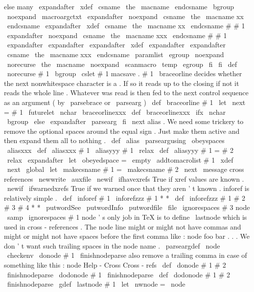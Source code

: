 {{else
%
many
\
expandafter
\
xdef
\
csname
\
the
\
macname
\
endcsname
{
%
\
bgroup
\
noexpand
\
macroargctxt
\
expandafter
\
noexpand
\
csname
\
the
\
macname
xx
\
endcsname
}
%
\
expandafter
\
xdef
\
csname
\
the
\
macname
xx
\
endcsname
#
#
1
{
%
\
expandafter
\
noexpand
\
csname
\
the
\
macname
xxx
\
endcsname
#
#
1
}
%
\
expandafter
\
expandafter
\
expandafter
\
xdef
\
expandafter
\
expandafter
\
csname
\
the
\
macname
xxx
\
endcsname
\
paramlist
{
%
\
egroup
\
noexpand
\
norecurse
{
\
the
\
macname
}
%
\
noexpand
\
scanmacro
{
\
temp
}
\
egroup
}
%
\
fi
\
fi
}
\
def
\
norecurse
#
1
{
\
bgroup
\
cslet
{
#
1
}
{
macsave
.
#
1
}
}
%
\
braceorline
decides
whether
the
next
nonwhitespace
character
is
a
%
{
.
If
so
it
reads
up
to
the
closing
}
if
not
it
reads
the
whole
%
line
.
Whatever
was
read
is
then
fed
to
the
next
control
sequence
%
as
an
argument
(
by
\
parsebrace
or
\
parsearg
)
\
def
\
braceorline
#
1
{
\
let
\
next
=
#
1
\
futurelet
\
nchar
\
braceorlinexxx
}
\
def
\
braceorlinexxx
{
%
\
ifx
\
nchar
\
bgroup
\
else
\
expandafter
\
parsearg
\
fi
\
next
}
%
alias
.
%
We
need
some
trickery
to
remove
the
optional
spaces
around
the
equal
%
sign
.
Just
make
them
active
and
then
expand
them
all
to
nothing
.
\
def
\
alias
{
\
parseargusing
\
obeyspaces
\
aliasxxx
}
\
def
\
aliasxxx
#
1
{
\
aliasyyy
#
1
\
relax
}
\
def
\
aliasyyy
#
1
=
#
2
\
relax
{
%
{
%
\
expandafter
\
let
\
obeyedspace
=
\
empty
\
addtomacrolist
{
#
1
}
%
\
xdef
\
next
{
\
global
\
let
\
makecsname
{
#
1
}
=
\
makecsname
{
#
2
}
}
%
}
%
\
next
}
\
message
{
cross
references
}
\
newwrite
\
auxfile
\
newif
\
ifhavexrefs
%
True
if
xref
values
are
known
.
\
newif
\
ifwarnedxrefs
%
True
if
we
warned
once
that
they
aren
'
t
known
.
%
inforef
is
relatively
simple
.
\
def
\
inforef
#
1
{
\
inforefzzz
#
1
*
*
}
\
def
\
inforefzzz
#
1
#
2
#
3
#
4
*
*
{
\
putwordSee
{
}
\
putwordInfo
{
}
\
putwordfile
{
}
\
file
{
\
ignorespaces
#
3
{
}
}
node
\
samp
{
\
ignorespaces
#
1
{
}
}
}
%
node
'
s
only
job
in
TeX
is
to
define
\
lastnode
which
is
used
in
%
cross
-
references
.
The
node
line
might
or
might
not
have
commas
and
%
might
or
might
not
have
spaces
before
the
first
comma
like
:
%
node
foo
bar
.
.
.
%
We
don
'
t
want
such
trailing
spaces
in
the
node
name
.
%
\
parseargdef
\
node
{
\
checkenv
{
}
\
donode
#
1
\
finishnodeparse
}
%
%
also
remove
a
trailing
comma
in
case
of
something
like
this
:
%
node
Help
-
Cross
Cross
-
refs
\
def
\
donode
#
1
#
2
\
finishnodeparse
{
\
dodonode
#
1
\
finishnodeparse
}
\
def
\
dodonode
#
1
#
2
\
finishnodeparse
{
\
gdef
\
lastnode
{
#
1
}
}
\
let
\
nwnode
=
\
node
\
}

